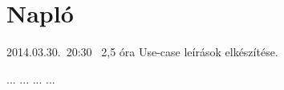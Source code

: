 %
\section{Napló}

\begin{naplo}

\bejegyzes
{2014.03.30.~20:30~} %
{2,5 óra} %
{\vadam} %
{Use-case leírások elkészítése.} %


\bejegyzes
{...}
{...}
{...}
{...}


\end{naplo}

